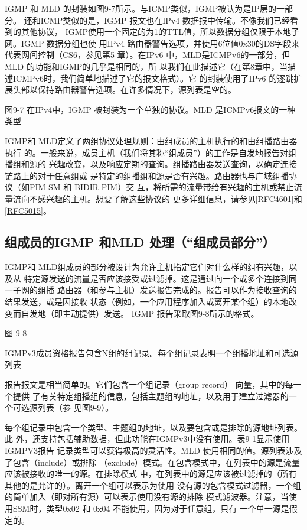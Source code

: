 IGMP 和 MLD 的封装如图9-7所示。与ICMP类似，IGMP被认为是IP层的一部分。
还和ICMP类似的是，IGMP 报文也在IPv4 数据报中传输。不像我们已经看到的其他协议，
IGMP使用一个固定的为1的TTL值，所以数据分组仅限于本地子网。IGMP 数据分组也使
用IPv4 路由器警告选项，并使用6位值0x30的DS字段来代表网间控制（CS6，参见第5
章）。在IPv6 中，MLD是ICMPv6的一部分，但 MLD 的功能和IGMP的几乎是相同的，所
以我们在此描述它（在第8章中，当描述ICMPv6时，我们简单地描述了它的报文格式）。它
的封装使用了IPv6 的逐跳扩展头部以保持路由器警告选项。在许多情况下，源列表是空的。

图9-7 在IPv4中，IGMP 被封装为一个单独的协议。MLD 是ICMPv6报文的一种类型

IGMP和 MLD定义了两组协议处理规则：由组成员的主机执行的和由组播路由器执行
的。一般来说，成员主机（我们将其称“组成员”）的工作是自发地报告对组播组和源的
兴趣改变，以及响应定期的查询。组播路由器发送查询，以确定连接链路上的对于任意组或
是特定的组播组和源是否有兴趣。路由器也与广域组播协议（如PIM-SM 和 BIDIR-PIM）交
互，将所需的流量带给有兴趣的主机或禁止流量流向不感兴趣的主机。想要了解这些协议的
更多详细信息，请参见\href{https://www.rfc-editor.org/rfc/rfc4601}{[RFC4601]}和 \href{https://www.rfc-editor.org/rfc/rfc5015}{[RFC5015]}。

\subsection{组成员的IGMP 和MLD 处理（“组成员部分”）}
IGMP和 MLD组成员的部分被设计为允许主机指定它们对什么样的组有兴趣，以及从
特定源发送的流量是否应该接受或过滤掉。这是通过向一个或多个连接到同一子网的组播
路由器（和参与主机）发送报告完成的。报告可以作为接收查询的结果发送，或是因接收
状态（例如，一个应用程序加入或离开某个组）的本地改变而自发地（即主动提供）发送。
IGMP 报告采取图9-8所示的格式。

图 9-8

IGMPv3成员资格报告包含N组的组记录。每个组记录表明一个组播地址和可选源列表

报告报文是相当简单的。它们包含一个组记录（group record） 向量，其中的每一个提供
了有关特定组播组的信息，包括主题组的地址，以及用于建立过滤器的一个可选源列表（参
见图9-9）。

每个组记录中包含一个类型、主题组的地址，以及要包含或是排除的源地址列表。此
外，还支持包括辅助数据，但此功能在IGMPv3中没有使用。表9-1显示使用IGMPV3报告
记录类型可以获得极高的灵活性。MLD 使用相同的值。源列表涉及了包含（include）或排除
（exclude）模式。在包含模式中，在列表中的源是流量应该被接收的唯一的源。在排除模式
中，在列表中的源是应该被过滤掉的（所有其他的是允许的）。离开一个组可以表示为使用
没有源的包含模式过滤器，一个组的简单加入（即对所有源）可以表示使用没有源的排除
模式滤波器。注意，当使用SSM时，类型0x02 和 0x04 不能使用，因为对于任意组，只有
一个单一源是假定的。


